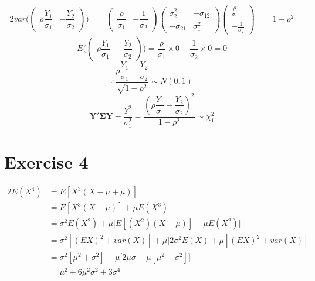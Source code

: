 \documentclass[a4papers]{ctexart}
\begin{document}
\begin{alignat*}{2}
    var\Bigg( \begin{pmatrix} \rho \dfrac {Y_{1}}{\sigma _{1}} & -\dfrac {Y_{2}}{\sigma _{2}} \end{pmatrix} \Bigg) 
    &= \begin{pmatrix} \dfrac{\rho}{\sigma_1} & -\dfrac{1}{\sigma_2} \end{pmatrix} 
       \begin{pmatrix}\sigma_2^2 & -\sigma_{12} \\ -\sigma_{21} & \sigma_1^2 \end{pmatrix}
       \begin{pmatrix} \frac{\rho}{\sigma_1} \\ -\frac{1}{\sigma_2} \end{pmatrix} 
    &= 1-\rho^2
\end{alignat*}
\[  
    E\Bigg(
            \begin{pmatrix} \rho \dfrac {Y_{1}}{\sigma _{1}} & -\dfrac {Y_{2}}{\sigma _{2}} \end{pmatrix}
    \Bigg) 
    = \dfrac {\rho}{\sigma _{1}}\times 0 -\dfrac {1}{\sigma _{2}}\times 0 = 0
\]
\[ \therefore \dfrac{ \rho \dfrac {Y_{1}}{\sigma _{1}}-\dfrac {Y_{2}}{\sigma _{2}}}{\sqrt{1-\rho^2}} \sim N(0,1) \]
\[ \boldsymbol{Y}' \boldsymbol{\Sigma}\boldsymbol{Y} - \dfrac{Y_1^2}{\sigma_1^2}
    = \dfrac {\left( \rho \dfrac {Y_{1}}{\sigma _{1}}-\dfrac {Y_{2}}{\sigma _{2}}\right) ^{2}}{1-\rho ^{2}} \sim \chi^2_1
\]


\section*{Exercise 4}
\begin{alignat*}{2}
     E(X^4)&=E[X^3(X-\mu+\mu)]\\
           &=E[X^3(X-\mu)]+\mu E(X^3)\\
           &=\sigma^2 E(X^2)+\mu \Big[ E[(X^2)(X-\mu)] + \mu E(X^2) \Big] \\
           &=\sigma^2 [(EX)^2+var(X)]+\mu \Big[ 2\sigma^2 E(X) + \mu [(EX)^2+var(X)] \Big] \\
           &=\sigma^2 [\mu^2+\sigma^2]+\mu \Big[ 2\mu \sigma + \mu [\mu ^2+\sigma^2] \Big] \\
           &=\mu^2 + 6\mu^2\sigma^2+3\sigma^4
\end{alignat*}

\radians
{}


    
\end{document}
